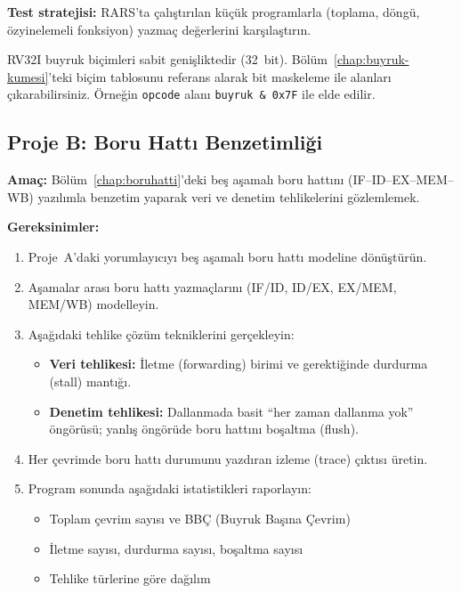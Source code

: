 \textbf{Test stratejisi:} RARS'ta çalıştırılan küçük programlarla (toplama, döngü, özyinelemeli fonksiyon) yazmaç değerlerini karşılaştırın.

\begin{bilginot}
RV32I buyruk biçimleri sabit genişliktedir (32~bit). Bölüm~\ref{chap:buyruk-kumesi}'teki biçim tablosunu referans alarak bit maskeleme ile alanları çıkarabilirsiniz. Örneğin \texttt{opcode} alanı \texttt{buyruk \& 0x7F} ile elde edilir.
\end{bilginot}


\subsection{Proje B: Boru Hattı Benzetimliği}
\label{sec:ekd-proje-b}

\textbf{Amaç:} Bölüm~\ref{chap:boruhatti}'deki beş aşamalı boru hattını (IF--ID--EX--MEM--WB) yazılımla benzetim yaparak veri ve denetim tehlikelerini gözlemlemek.\smallskip

\textbf{Gereksinimler:}
\begin{enumerate}[leftmargin=2em]
    \item Proje~A'daki yorumlayıcıyı beş aşamalı boru hattı modeline dönüştürün.
    \item Aşamalar arası boru hattı yazmaçlarını (IF/ID, ID/EX, EX/MEM, MEM/WB) modelleyin.
    \item Aşağıdaki tehlike çözüm tekniklerini gerçekleyin:
    \begin{itemize}[leftmargin=1.5em]
        \item \textbf{Veri tehlikesi:} İletme (forwarding) birimi ve gerektiğinde durdurma (stall) mantığı.
        \item \textbf{Denetim tehlikesi:} Dallanmada basit ``her zaman dallanma yok'' öngörüsü; yanlış öngörüde boru hattını boşaltma (flush).
    \end{itemize}
    \item Her çevrimde boru hattı durumunu yazdıran izleme (trace) çıktısı üretin.
    \item Program sonunda aşağıdaki istatistikleri raporlayın:
    \begin{itemize}[leftmargin=1.5em]
        \item Toplam çevrim sayısı ve BBÇ (Buyruk Başına Çevrim)
        \item İletme sayısı, durdurma sayısı, boşaltma sayısı
        \item Tehlike türlerine göre dağılım
    \end{itemize}
\end{enumerate}

